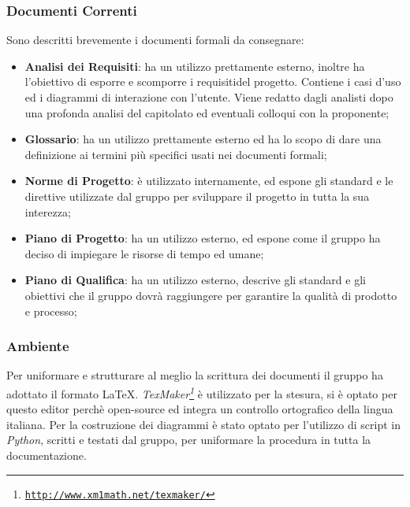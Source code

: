 \subsubsection{Documenti Correnti}
\label{ProcessiSupporto_Documentazione_DocumentiCorrenti}
Sono descritti brevemente i documenti formali da consegnare:
\begin{itemize}
	\item \textbf{Analisi dei Requisiti}: ha un utilizzo prettamente esterno, inoltre ha l'obiettivo di esporre e scomporre i requisiti\glossario del progetto. Contiene i casi d'uso ed i diagrammi di interazione con l'utente. Viene redatto dagli analisti dopo una profonda analisi del capitolato ed eventuali colloqui con la proponente; 
	\item \textbf{Glossario}: ha un utilizzo prettamente esterno ed ha lo scopo di dare una definizione ai termini più specifici usati nei documenti formali;
	\item \textbf{Norme di Progetto}: è utilizzato internamente, ed espone gli standard e le direttive utilizzate dal gruppo per sviluppare il progetto in tutta la sua interezza;
	\item \textbf{Piano di Progetto}: ha un utilizzo esterno, ed espone come il gruppo ha deciso di impiegare le risorse di tempo ed umane;
	\item \textbf{Piano di Qualifica}: ha un utilizzo esterno, descrive gli standard e gli obiettivi che il gruppo dovrà raggiungere per garantire la qualità di prodotto e processo;
\end{itemize}

\subsubsection{Ambiente}\label{ProcessiSupporto_Documentazione_Ambiente} 
Per uniformare e strutturare al meglio la scrittura dei documenti il gruppo ha adottato il formato \LaTeX. 
\textit{TexMaker\footnote{\texttt{\url{http://www.xm1math.net/texmaker/}}}} è utilizzato per la stesura, si è optato per questo editor perchè open-source ed integra un controllo ortografico della lingua italiana. 
Per la costruzione dei diagrammi è stato optato per l'utilizzo di script in \textit{Python}, scritti e testati dal gruppo, per uniformare la procedura in tutta la documentazione.

